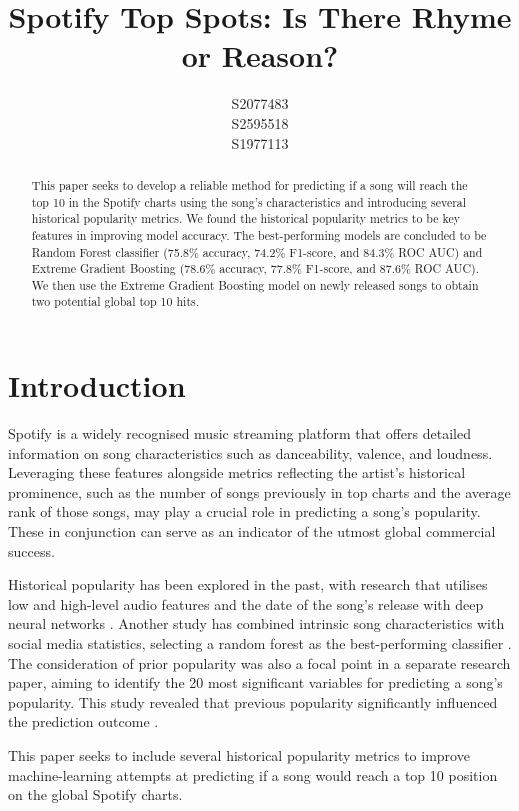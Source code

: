 \documentclass{article}
\title{Spotify Top Spots: Is There Rhyme or Reason?}
\author{
  S2077483\\
  \And
  S2595518\\
 \And
  S1977113\\
}
\begin{document}
\maketitle

\begin{abstract}

 This paper seeks to develop a reliable method for predicting if a song will reach the top 10 in the Spotify charts using the song's characteristics and introducing several historical popularity metrics. We found the historical popularity metrics to be key features in improving model accuracy. The best-performing models are concluded to be Random Forest classifier (75.8\% accuracy, 74.2\% F1-score, and 84.3\% ROC AUC) and Extreme Gradient Boosting (78.6\% accuracy, 77.8\% F1-score, and 87.6\% ROC AUC). We then use the Extreme Gradient Boosting model on newly released songs to obtain two potential global top 10 hits. 

 
 
\end{abstract}

\section{Introduction}

Spotify is a widely recognised music streaming platform that offers detailed information on song
characteristics such as danceability, valence, and loudness. Leveraging these features alongside
metrics reflecting the artist’s historical prominence, such as the number of songs previously in top
charts and the average rank of those songs, may play a crucial role in predicting a song’s popularity. These in conjunction can serve as an indicator of the utmost global commercial success. 

 Historical popularity has been explored in the past, with research that utilises low and high-level audio features and the date of the song’s release with deep neural networks \cite{study}. Another study has combined intrinsic song characteristics with social media statistics, selecting a random forest as the best-performing classifier \cite{journal2}. The consideration of prior popularity was also a focal point in a separate research paper, aiming to identify the 20 most significant variables for predicting a song’s popularity. This study revealed that previous popularity significantly influenced the prediction outcome \cite{thesis}. 

This paper seeks to include several historical popularity metrics to improve machine-learning attempts at predicting if a song would reach a top 10 position on the global Spotify charts. 
\end{document}
